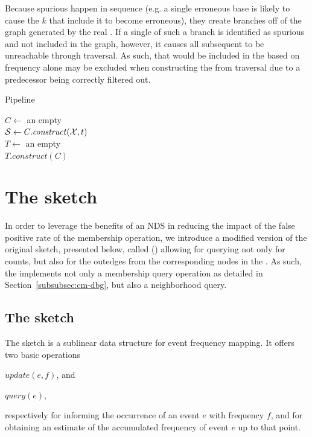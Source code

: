 Because spurious  happen in sequence (e.g. a single erroneous base is likely to cause the $k$  that include it to become erroneous), they create branches off of the graph generated by the real . If a single \kmer of such a branch is identified as spurious and not included in the graph, however, it causes all subsequent  to be unreachable through traversal. As such,  that would be included in the \dBG based on frequency alone may be excluded when constructing the \dBHT from traversal due to a predecessor being correctly filtered out.

\begin{algorithm}
  \caption{Pipeline}\label{alg:pipeline}
  $C \gets$ an empty \dBCM\\
  $\strsetname{S} \gets C.\mathit{construct}(\readset, t)$\\
  $T \gets$ an empty \dBHT\\
  $T.\mathit{construct}(C)$\\
\end{algorithm}


\section{The \dB\cm sketch}
\label{sec:debruijncountmin}

In order to leverage the benefits of an NDS in reducing the impact of the false positive rate of the membership operation, we introduce a modified version of the original \cm sketch, presented below, called \keyterm{\dB\cm} (\dBCM) allowing for querying not only for \kmer counts, but also for the outedges from the corresponding nodes in the \dBG. As such, the \dBCM implements not only a membership query operation as detailed in Section~\ref{subsubsec:cm-dbg}, but also a neighborhood query.



\subsection{The \cm sketch}
\label{sec:countmin}

The \cm sketch \cite{Cormode2005} is a sublinear data structure for event frequency mapping.
It offers two basic operations
\begin{compactenum}
\item $update(e, f)$, and
\item $query(e)$,
\end{compactenum}
respectively for informing the occurrence of an event $e$ with frequency $f$, and for obtaining an estimate of the accumulated frequency of event $e$ up to that point.


